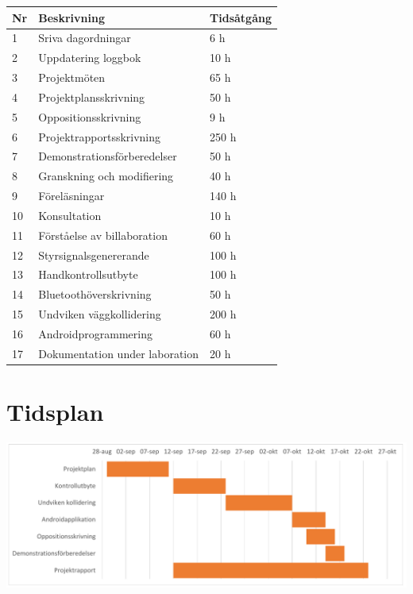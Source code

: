 \documentclass[a4paper]{article}
\begin{document}
\begin{tabular}{|l|l|l|} \hline
\bf Nr & \bf Beskrivning                & \bf Tidsåtgång \\ \hline \hline
1      & Sriva dagordningar             & 6   h \\ \hline
2      & Uppdatering loggbok            & 10  h \\ \hline
3      & Projektmöten                   & 65  h \\ \hline
4      & Projektplansskrivning          & 50  h \\ \hline
5      & Oppositionsskrivning           & 9   h \\ \hline
6      & Projektrapportsskrivning       & 250 h \\ \hline
7      & Demonstrationsförberedelser    & 50  h \\ \hline
8      & Granskning och modifiering     & 40  h \\ \hline
9      & Föreläsningar                  & 140 h \\ \hline
10     & Konsultation                   & 10  h \\ \hline 
11     & Förståelse av billaboration    & 60  h \\ \hline
12     & Styrsignalsgenererande         & 100 h \\ \hline
13     & Handkontrollsutbyte            & 100 h \\ \hline
14     & Bluetoothöverskrivning         & 50  h \\ \hline
15     & Undviken väggkollidering       & 200 h \\ \hline
16     & Androidprogrammering           & 60  h \\ \hline 
17     & Dokumentation under laboration & 20  h \\ \hline
\end{tabular}

\section{Tidsplan}

\includegraphics[width=\textwidth]{gantt.pdf}
\end{document}
